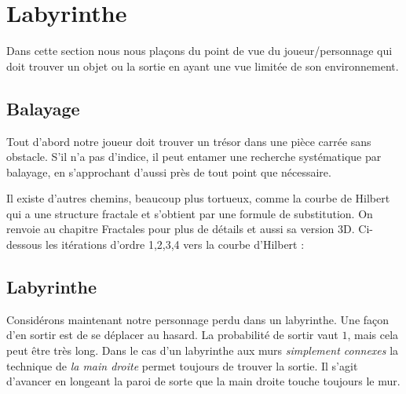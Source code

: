 \documentclass[11pt,class=report,crop=false]{standalone}
\begin{document}


\section{Labyrinthe}

Dans cette section nous nous plaçons du point de vue du joueur/personnage qui doit trouver un objet ou la sortie en ayant une vue limitée de son environnement.


\subsection{Balayage}

Tout d'abord notre joueur doit trouver un trésor dans une pièce carrée sans obstacle. S'il n'a pas d'indice, il peut entamer une recherche systématique par balayage, en s'approchant d'aussi près de tout point que nécessaire.



Il existe d'autres chemins, beaucoup plus tortueux, comme la courbe de Hilbert qui a une structure fractale et s'obtient par une formule de substitution.
On renvoie au chapitre \og{}Fractales\fg{} pour plus de détails et aussi sa version 3D. 
Ci-dessous les itérations d'ordre 1,2,3,4 vers la courbe d'Hilbert :


\subsection{Labyrinthe}

Considérons maintenant notre personnage perdu dans un labyrinthe.
Une façon d'en sortir est de se déplacer au hasard. La probabilité de sortir vaut $1$, mais cela peut être très long.
Dans le cas d'un labyrinthe aux murs \emph{simplement connexes} la technique de \emph{la main droite} permet toujours de trouver la sortie.
Il s'agit d'avancer en longeant la paroi de sorte que la main droite touche toujours le mur. 

\end{document}
